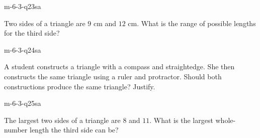 \begin{practiceQuestion}{m-6-3-q23}{sa}
\begin{questionText}
Two sides of a triangle are $9$ cm and $12$ cm. What is the range of possible lengths for the third side?
\end{questionText}
\end{practiceQuestion}

\begin{practiceQuestion}{m-6-3-q24}{sa}
\begin{questionText}
A student constructs a triangle with a compass and straightedge. She then constructs the same triangle using a ruler and protractor. Should both constructions produce the same triangle? Justify.
\end{questionText}
\end{practiceQuestion}

\begin{practiceQuestion}{m-6-3-q25}{sa}
\begin{questionText}
The largest two sides of a triangle are $8$ and $11$. What is the largest whole-number length the third side can be?
\end{questionText}
\end{practiceQuestion}


